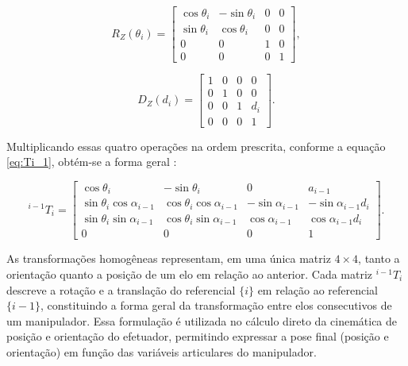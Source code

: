 \begin{equation}
R_Z(\theta_i) =
\begin{bmatrix}
\cos\theta_i & -\sin\theta_i & 0 & 0 \\
\sin\theta_i &  \cos\theta_i & 0 & 0 \\
0 & 0 & 1 & 0 \\
0 & 0 & 0 & 1
\end{bmatrix},
\end{equation}

\begin{equation}
D_Z(d_i) =
\begin{bmatrix}
1 & 0 & 0 & 0 \\
0 & 1 & 0 & 0 \\
0 & 0 & 1 & d_i \\
0 & 0 & 0 & 1
\end{bmatrix}.
\end{equation}

Multiplicando essas quatro operações na ordem prescrita, conforme a equação \eqref{eq:Ti_1}, obtém-se a forma geral \cite{craig2005}:

\begin{equation}
\label{eq:transf_homogenea_geral_Craig}
{}^{i-1}T_i =
\begin{bmatrix}
\cos\theta_i & -\sin\theta_i & 0 & a_{i-1} \\
\sin\theta_i\cos\alpha_{i-1} &
\cos\theta_i\cos\alpha_{i-1} &
-\sin\alpha_{i-1} &
-\sin\alpha_{i-1}d_i \\
\sin\theta_i\sin\alpha_{i-1} &
\cos\theta_i\sin\alpha_{i-1} &
\cos\alpha_{i-1} &
\cos\alpha_{i-1}d_i \\
0 & 0 & 0 & 1
\end{bmatrix}.
\end{equation}


As transformações homogêneas representam, em uma única matriz $4\times 4$, tanto a orientação quanto a posição de um elo em relação ao anterior.
Cada matriz ${}^{i-1}T_i$ descreve a rotação e a translação do referencial $\{i\}$ em relação ao referencial $\{i-1\}$, constituindo a forma geral da transformação entre elos consecutivos de um manipulador.
Essa formulação é utilizada no cálculo direto da cinemática de posição e orientação do efetuador, permitindo expressar a pose final (posição e orientação) em função das variáveis articulares do manipulador.
